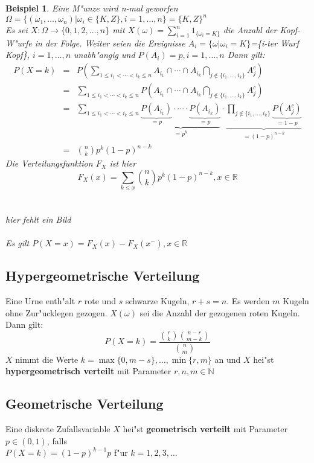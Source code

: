 \documentclass[a4paper,11pt]{book}
\newcommand{\R}{{\mathbb R}}
\newcommand{\N}{{\mathbb N}}
\newtheorem{Bsp}{Beispiel}[chapter]
\theoremstyle{nonumberplain}
\begin{document}
\begin{Bsp}
Eine M"unze wird n-mal geworfen\\
$\Omega=\{(\omega_1,\ldots,\omega_n)|\omega_i\in \{K,Z\}, i=1,\ldots,n\}=\{K,Z\}^n$\\
Es sei $X:\Omega\rightarrow\{0,1,2,\ldots,n\}$ mit $X(\omega)=\sum_{i=1}^n 1_{\{\omega_i=K\}}$ die Anzahl der Kopf-W"urfe in der Folge. Weiter seien die Ereignisse $A_i=\{\omega|\omega_i=K\}$=\{i-ter Wurf Kopf\}, $i=1,\ldots,n$ unabh"angig und $P(A_i)=p , i=1,\ldots,n$ Dann gilt:
\begin{eqnarray*}
P(X=k) & = & P(\sum_{1\leq i_1<\cdots <i_k\leq n}A_{i_1}\cap\cdots\cap A_{i_k}\bigcap_{j\notin \{i_1,\ldots,i_k\}} A_j^c) \\
& = & \sum_{1\leq i_1<\cdots <i_k\leq n}P(A_{i_1}\cap\cdots\cap A_{i_k} \bigcap_{j\notin \{i_1,\ldots,i_k\}}A_j^c) \\
& = & \sum_{1\leq i_1<\cdots <i_k\leq n} \underbrace{\underbrace{P(A_{i_1})}_{=p} \cdot \cdots \cdot \underbrace{P(A_{i_k})}_{=p}}_{=p^k} \cdot \underbrace{\prod_{j\notin \{i_1,\ldots,i_k\}} \underbrace{P(A_j^c)}_{=1-p}}_{=(1-p)^{n-k}} \\
& = &\binom{n}{k} p^k(1-p)^{n-k}
\end{eqnarray*}
Die Verteilungsfunktion $F_X$ ist hier\\
\[F_X(x)=\sum_{k\leq x} \binom{n}{k} p^k(1-p)^{n-k} , x\in\R\]\\
\\
hier fehlt ein Bild\\
\\
Es gilt $P(X=x)=F_X(x)-F_X(x^-), x\in\R$
\end{Bsp}

\subsection{Hypergeometrische Verteilung}
Eine Urne enth"alt $r$ rote und $s$ schwarze Kugeln, $r+s=n$. Es werden $m$ Kugeln ohne Zur"ucklegen gezogen. $X(\omega)$ sei die Anzahl der gezogenen roten Kugeln. Dann gilt:
\[P(X=k)=\frac{\binom{r}{k}\binom{n-r}{m-k}}{\binom{n}{m}}\]
$X$ nimmt die Werte $k=\max\{0,m-s\},\ldots,\min\{r,m\}$ an und $X$ hei"st \textbf{hypergeometrisch verteilt} mit Parameter $r,n,m \in \N$

\subsection{Geometrische Verteilung}
Eine diskrete Zufallsvariable $X$ hei"st \textbf{geometrisch verteilt} mit Parameter $p\in (0,1)$, falls\\
$P(X=k)=(1-p)^{k-1}p$ f"ur $k=1,2,3,\ldots$
\end{document}
